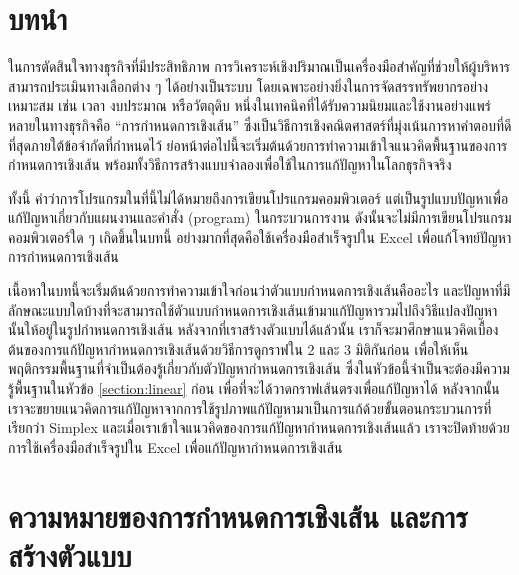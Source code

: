 



\section*{บทนำ}
ในการตัดสินใจทางธุรกิจที่มีประสิทธิภาพ การวิเคราะห์เชิงปริมาณเป็นเครื่องมือสำคัญที่ช่วยให้ผู้บริหารสามารถประเมินทางเลือกต่าง ๆ ได้อย่างเป็นระบบ โดยเฉพาะอย่างยิ่งในการจัดสรรทรัพยากรอย่างเหมาะสม เช่น เวลา งบประมาณ หรือวัตถุดิบ หนึ่งในเทคนิคที่ได้รับความนิยมและใช้งานอย่างแพร่หลายในทางธุรกิจคือ “การกำหนดการเชิงเส้น” ซึ่งเป็นวิธีการเชิงคณิตศาสตร์ที่มุ่งเน้นการหาคำตอบที่ดีที่สุดภายใต้ข้อจำกัดที่กำหนดไว้ ย่อหน้าต่อไปนี้จะเริ่มต้นด้วยการทำความเข้าใจแนวคิดพื้นฐานของการกำหนดการเชิงเส้น พร้อมทั้งวิธีการสร้างแบบจำลองเพื่อใช้ในการแก้ปัญหาในโลกธุรกิจจริง

ทั้งนี้ คำว่าการโปรแกรมในที่นี้ไม่ได้หมายถึงการเขียนโปรแกรมคอมพิวเตอร์ แต่เป็นรูปแบบปัญหาเพื่อแก้ปัญหาเกี่ยวกับแผนงานและคำสั่ง (program) ในกระบวนการงาน ดังนั้นจะไม่มีการเขียนโปรแกรมคอมพิวเตอร์ใด ๆ เกิดขึ้นในบทนี้ อย่างมากที่สุดคือใช้เครื่องมือสำเร็จรูปใน Excel เพื่อแก้โจทย์ปัญหาการกำหนดการเชิงเส้น

เนื้อหาในบทนี้จะเริ่มต้นด้วยการทำความเข้าใจก่อนว่าตัวแบบกำหนดการเชิงเส้นคืออะไร และปัญหาที่มีลักษณะแบบใดบ้างที่จะสามารถใช้ตัวแบบกำหนดการเชิงเส้นเข้ามาแก้ปัญหารวมไปถึงวิธีแปลงปัญหานั้นให้อยู่ในรูปกำหนดการเชิงเส้น
หลังจากที่เราสร้างตัวแบบได้แล้วนั้น เราก็จะมาศึกษาแนวคิดเบื้องต้นของการแก้ปัญหากำหนดการเชิงเส้นด้วยวิธีการดูกราฟใน 2 และ 3 มิติกันก่อน
เพื่อให้เห็นพฤติกรรมพื้นฐานที่จำเป็นต้องรู้เกี่ยวกับตัวปัญหากำหนดการเชิงเส้น ซึ่งในหัวข้อนี้จำเป็นจะต้องมีความรู้พื้นฐานในหัวข้อ \ref{section:linear} ก่อน เพื่อที่จะได้วาดกราฟเส้นตรงเพื่อแก้ปัญหาได้
หลังจากนั้น เราจะขยายแนวคิดการแก้ปัญหาจากการใช้รูปภาพแก้ปัญหามาเป็นการแก้ด้วยขั้นตอนกระบวนการที่เรียกว่า Simplex
และเมื่อเราเข้าใจแนวคิดของการแก้ปัญหากำหนดการเชิงเส้นแล้ว เราจะปิดท้ายด้วยการใช้เครื่องมือสำเร็จรูปใน Excel เพื่อแก้ปัญหากำหนดการเชิงเส้น

\section{ความหมายของการกำหนดการเชิงเส้น และการสร้างตัวแบบ}

